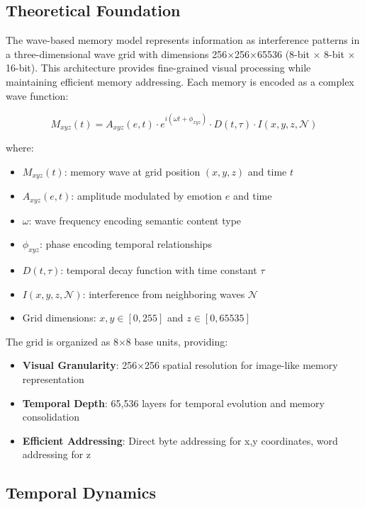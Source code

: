 \documentclass[11pt,letterpaper]{article}
\begin{document}
\subsection{Theoretical Foundation}

The wave-based memory model represents information as interference patterns in a three-dimensional wave grid with dimensions 256×256×65536 (8-bit × 8-bit × 16-bit). This architecture provides fine-grained visual processing while maintaining efficient memory addressing. Each memory is encoded as a complex wave function:

\begin{equation}
M_{xyz}(t) = A_{xyz}(e,t) \cdot e^{i(\omega t + \phi_{xyz})} \cdot D(t,\tau) \cdot I(x,y,z,\mathcal{N})
\end{equation}

where:
\begin{itemize}
\item $M_{xyz}(t)$: memory wave at grid position $(x,y,z)$ and time $t$
\item $A_{xyz}(e,t)$: amplitude modulated by emotion $e$ and time
\item $\omega$: wave frequency encoding semantic content type
\item $\phi_{xyz}$: phase encoding temporal relationships
\item $D(t,\tau)$: temporal decay function with time constant $\tau$
\item $I(x,y,z,\mathcal{N})$: interference from neighboring waves $\mathcal{N}$
\item Grid dimensions: $x,y \in [0,255]$ and $z \in [0,65535]$
\end{itemize}

The grid is organized as 8×8 base units, providing:
\begin{itemize}
\item \textbf{Visual Granularity}: 256×256 spatial resolution for image-like memory representation
\item \textbf{Temporal Depth}: 65,536 layers for temporal evolution and memory consolidation
\item \textbf{Efficient Addressing}: Direct byte addressing for x,y coordinates, word addressing for z
\end{itemize}

\subsection{Temporal Dynamics}
\end{document}

